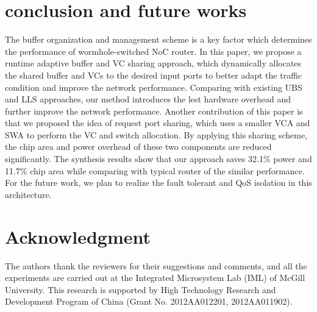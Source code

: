 \documentclass[paper]{ieice}
\begin{document}
\section{conclusion and future works}\label{conc}
The buffer organization and management scheme is a key factor which determines the performance of wormhole-switched NoC router. In this paper, we propose a runtime adaptive buffer and VC sharing approach, which dynamically allocates the shared buffer and VCs to the desired input ports to better adapt the traffic condition and improve the network performance. Comparing with existing UBS and LLS approaches, our method introduces the lest hardware overhead and further improve the network performance. Another contribution of this paper is that we proposed the idea of request port sharing, which uses a smaller VCA and SWA to perform the VC and switch allocation. By applying this sharing scheme, the chip area and power overhead of these two components are reduced significantly. The synthesis results show that our approach saves 32.1\% power and 11.7\% chip area while comparing with typical router of the similar performance. For the future work, we plan to realize the fault tolerant and QoS isolation in this architecture.

\section*{Acknowledgment}
The authors thank the reviewers for their suggestions and comments, and all the experiments are carried out at the Integrated Microsystem Lab (IML) of McGill University. This research is supported by High Technology Research and Development Program of China (Grant No. 2012AA012201, 2012AA011902).


\end{document}
